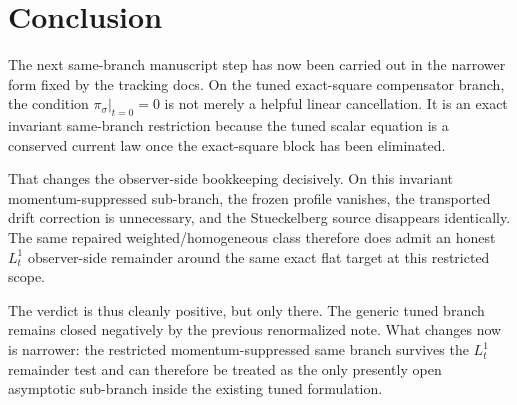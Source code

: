 \documentclass[11pt]{article}
\begin{document}
\section{Conclusion}

The next same-branch manuscript step has now been carried out in the narrower form fixed by the tracking docs. On the tuned exact-square compensator branch, the condition \(\pi_\sigma|_{t=0}=0\) is not merely a helpful linear cancellation. It is an exact invariant same-branch restriction because the tuned scalar equation is a conserved current law once the exact-square block has been eliminated.

That changes the observer-side bookkeeping decisively. On this invariant momentum-suppressed sub-branch, the frozen profile vanishes, the transported drift correction is unnecessary, and the Stueckelberg source disappears identically. The same repaired weighted/homogeneous class therefore does admit an honest \(L_t^1\) observer-side remainder around the same exact flat target at this restricted scope.

The verdict is thus cleanly positive, but only there. The generic tuned branch remains closed negatively by the previous renormalized note. What changes now is narrower: the restricted momentum-suppressed same branch survives the \(L_t^1\) remainder test and can therefore be treated as the only presently open asymptotic sub-branch inside the existing tuned formulation.
\end{document}

